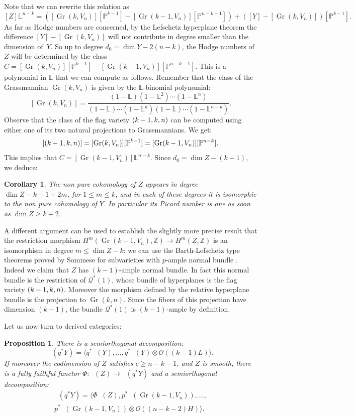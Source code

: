 \documentclass[11pt]{article}
\newcommand{\NoChangel}[1]{%
\expandafter\let\csname old\string#1\endcsname=#1
\let#1=\relax
\newcommand{#1}{\mathcode`l="716C\csname old\string#1\endcsname\mathcode`l="7160 }%
}
\let\mathcal\mathscr
\theoremstyle{plain}
\newtheorem{prop}[theorem]{Proposition}
\newtheorem{cor}[theorem]{Corollary}
\theoremstyle{definition}
\newcommand{\cat}[1]{\mathsf{#1}}
\newcommand{\sod}[1]{\langle #1 \rangle}
\newcommand{\bsod}[1]{\bigl\langle #1\bigr\rangle}
\DeclareMathOperator{\Db}{{\cat{D}^{\mathrm{b}}}}
\DeclareMathOperator{\Gr}{Gr}
\DeclareMathOperator{\Fl}{Fl}\NoChangel{\Fl}
\newcommand{\ZZ}{\mathbb{Z}}
\newcommand{\LL}{\mathbb{L}}
\newcommand{\PP}{\mathbb{P}}
\newcommand{\sheaf}[1]{\mathcal{#1}}
\newcommand{\ko}{\sheaf{O}}\let\OO\ko\let\cO\ko
\begin{document}
Note that we can rewrite this relation as
\[
[Z]\LL^{n-k}=
([\Gr(k,V_n)][\PP^{k-1}]-[\Gr(k-1,V_n)][\PP^{n-k-1}])+([Y]-[\Gr(k,V_n)])[\PP^{k-1}].
\]
As far as Hodge numbers are concerned, by the Lefschetz hyperplane theorem the difference
$[Y]-[\Gr(k,V_n)]$ will
not contribute in degree smaller than the dimension of~$Y$. So up to degree $d_0=\dim Y-2(n-k)$,
the Hodge numbers of $Z$ will be determined by the class $C=[\Gr(k,V_n)][\PP^{k-1}]-[\Gr(k-1,V_n)][\PP^{n-k-1}]$.
This is a polynomial in $\LL$ that we can compute as follows. Remember that the class of the Grassmannian $\Gr(k,V_n)$
is given by the $\LL$-binomial polynomial:
\[
[\Gr(k,V_n)]=\frac{(1-\LL)(1-\LL^2)\cdots (1-\LL^n)}{(1-\LL)\cdots (1-\LL^k)(1-\LL)\cdots (1-\LL^{n-k})}.
\]
Observe that the class of the flag variety $\Fl(k-1,k,n)$ can be computed using either one of its two natural
projections to Grassmannians. We get:
\[
[\Fl(k-1,k,n)]=[\Gr(k,V_n)][\PP^{k-1}]=[\Gr(k-1,V_n)][\PP^{n-k}].
\]
This implies that $C=[\Gr(k-1,V_n)]\LL^{n-k}$. Since $d_0=\dim Z-(k-1)$, we deduce:

\begin{cor}\label{hodgeZ}
The non pure cohomology of $Z$ appears in degree \hbox{$\dim Z\!-\!k\!-\!1\!+\!2m$}, for $1\le m\le k$,
and in each of these degrees it is isomorphic to the non pure cohomology of $Y$.
In particular its Picard number is one as soon as $\dim Z\ge k+2$.
\end{cor}

A different argument can be used to establish the slightly more precise result that the restriction morphism $H^m(\Gr(k-1,V_n),\ZZ)\to H^m(Z,\ZZ)$ is an isomorphism
in degree $m\le \dim Z -k$: we can use the Barth-Lefschetz type theorems proved
by Sommese for subvarieties with $p$-ample normal bundle \cite[Prop.\,2.6]{sommese}. Indeed we
claim that $Z$ has $(k-1)$-ample normal bundle. In fact this normal bundle is the restriction of
$\mathcal{Q}^*(1)$, whose bundle of hyperplanes is the flag variety $\Fl(k-1,k,n)$. Moreover the morphism
defined by the relative hyperplane bundle is the projection to $\Gr(k,n)$. Since the fibers of
this projection have dimension $(k-1)$, the bundle $\mathcal{Q}^*(1)$ is $(k-1)$-ample by definition.

Let us now turn to derived categories:

\begin{prop}\label{prop:semiorth-for-Hsections-in-jumps}
There is a semiorthogonal decomposition:
\begin{equation}\label{eq:orlov-deco-jump}
\Db(q^* Y) = \sod{q^*\Db(Y),\ldots,q^*\Db(Y)\otimes \ko((k-1)L)}.
\end{equation}
If moreover the codimension of $Z$ satisfies $c \geq n-k-1$, and $Z$ is smooth, there is a fully faithful functor
$\Phi: \Db(Z) \to \Db(q^* Y)$ and a semiorthogonal decomposition:%
\begin{multline}\label{eq:our-deco-jump}
\Db(q^* Y)
= \bsod{\Phi\Db(Z), p^*\Db(\Gr(k-1,V_n)),\ldots,\\
p^*\Db(\Gr(k-1,V_n))\otimes \ko((n-k-2)H)}.
\end{multline}
\end{prop}
\end{document}
